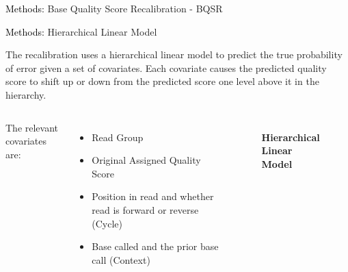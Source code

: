 \documentclass{beamer}
\begin{document}
\begin{frame}{}
\begin{columns}[T]
\begin{column}[T]{.5\linewidth}
\begin{block}{\textcolor{black}{Methods:} Base Quality Score Recalibration - BQSR}
\begin{figure}
\begin{center}
\end{center}
\end{figure}

\end{block}

\begin{block}{\textcolor{black}{Methods:} Hierarchical Linear Model}

The recalibration uses a hierarchical linear model to predict the true probability of error given a set of covariates.
Each covariate causes the predicted quality score to shift up or down from the predicted score one level above it in the hierarchy.

\begin{columns}

The relevant covariates are:
\begin{itemize}
	\item Read Group
	\item Original Assigned Quality Score
	\item Position in read and whether read is forward or reverse (Cycle)
	\item Base called and the prior base call (Context)
\end{itemize}


\begin{figure}
\begin{center}

\textbf{Hierarchical Linear Model}


\end{center}
\end{figure}
\end{columns}
\end{block}
\end{column}
\end{columns}
\end{frame}
\end{document}
